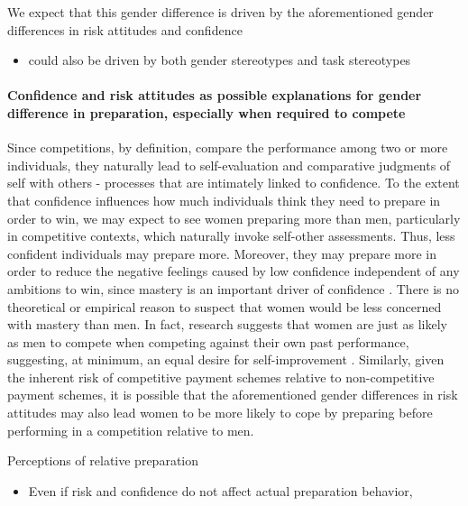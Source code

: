 \documentclass[a4paper, nobind]{templates/ociamthesis}
\providecommand{\tightlist}{%
  \setlength{\itemsep}{0pt}\setlength{\parskip}{0pt}}
\begin{document}
We expect that this gender difference is driven by the aforementioned gender differences in risk attitudes and confidence

\begin{itemize}
\tightlist
\item
  could also be driven by both gender stereotypes and task stereotypes
\end{itemize}

\hypertarget{confidence-and-risk-attitudes-as-possible-explanations-for-gender-difference-in-preparation-especially-when-required-to-compete}{%
\paragraph{Confidence and risk attitudes as possible explanations for gender difference in preparation, especially when required to compete}\label{confidence-and-risk-attitudes-as-possible-explanations-for-gender-difference-in-preparation-especially-when-required-to-compete}}

Since competitions, by definition, compare the performance among two or more individuals, they naturally lead to self-evaluation and comparative judgments of self with others - processes that are intimately linked to confidence. To the extent that confidence influences how much individuals think they need to prepare in order to win, we may expect to see women preparing more than men, particularly in competitive contexts, which naturally invoke self-other assessments. Thus, less confident individuals may prepare more. Moreover, they may prepare more in order to reduce the negative feelings caused by low confidence independent of any ambitions to win, since mastery is an important driver of confidence \autocite{Gist1992,Usher2008}. There is no theoretical or empirical reason to suspect that women would be less concerned with mastery than men. In fact, research suggests that women are just as likely as men to compete when competing against their own past performance, suggesting, at minimum, an equal desire for self-improvement \autocite{Apicella2017a}. Similarly, given the inherent risk of competitive payment schemes relative to non-competitive payment schemes, it is possible that the aforementioned gender differences in risk attitudes may also lead women to be more likely to cope by preparing before performing in a competition relative to men.

Perceptions of relative preparation

\begin{itemize}
\tightlist
\item
  Even if risk and confidence do not affect actual preparation behavior,
\end{itemize}
\end{document}
